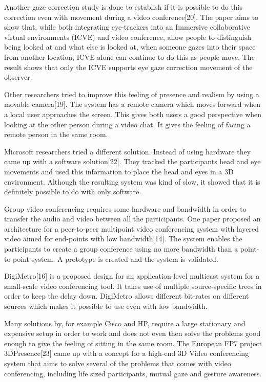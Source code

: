 \documentclass[12pt, titlepage]{article}
\begin{document}
Another gaze correction study is done to establish if it is possible to do this correction even with movement during a video conference[20]. The paper aims to show that, while both integrating eye-trackers into an Immersive collaborative virtual
environments (ICVE) and video conference, allow people to distinguish being looked at and what else is looked at, when someone gazes into their space from another location, ICVE alone can continue to do this as people move. The result shows that only the ICVE supports eye gaze correction movement of the observer.

Other researchers tried to improve this feeling of presence and realism by using a movable camera[19]. The system has a remote camera which moves forward when a local user approaches the screen. This gives both users a good perspective when looking at the other person during a video chat. It gives the feeling of facing a remote person in the same room.

Microsoft researchers tried a different solution. Instead of using hardware they came up with a software solution[22]. They tracked the participants head and eye movements and used this information to place the head and eyes in a 3D environment. Although the resulting system was kind of slow, it showed that it is definitely possible to do with only software.

Group video conferencing requires some hardware and bandwidth in order to transfer the audio and video between all the participants.
One paper proposed an architecture for a peer-to-peer multipoint video conferencing system with layered video aimed for end-points with low bandwidth[14]. The system enables the participants to create a group conference using no more bandwidth than a point-to-point system. A prototype is created and the system is validated.

DigiMetro[16] is a proposed design for an application-level multicast system for a small-scale video conferencing tool. It takes use of multiple source-specific trees in order to keep the delay down. DigiMetro allows different bit-rates on different sources which makes it possible to use even with low bandwidth.

Many solutions by, for example Cisco and HP, require a large stationary and expensive setup in order to work and does not even then solve the problems good enough to give the feeling of sitting in the same room. The European FP7 project 3DPresence[23] came up with a concept for a high-end 3D Video conferencing system that aims to solve several of the problems that comes with video conferencing, including life sized participants, mutual gaze and gesture awareness.
\end{document}
